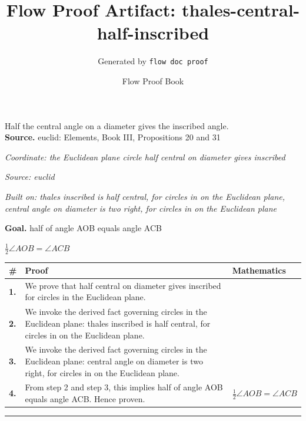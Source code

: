 \documentclass[11pt]{article}
\title{Flow Proof Artifact: thales-central-half-inscribed}
\author{Generated by \texttt{flow doc proof}}
\date{Flow Proof Book}
\theoremstyle{definition}
\begin{document}
\maketitle
Half the central angle on a diameter gives the inscribed angle.\\[0.5em]
\textbf{Source.} euclid: Elements, Book III, Propositions 20 and 31\\[0.5em]
\bigskip
{}\par
\smallskip\noindent\textit{Coordinate: the Euclidean plane \cdot circle \cdot half central on diameter gives inscribed}\par
\smallskip\noindent\textit{Source: euclid}\par
\smallskip\noindent\textit{Built on: thales inscribed is half central, for circles in on the Euclidean plane, central angle on diameter is two right, for circles in on the Euclidean plane}\par
\medskip
\noindent\textbf{Goal.} half of angle AOB equals angle ACB\par
\noindent$\displaystyle \tfrac{1}{2}\angle AOB = \angle ACB$\par
\medskip
\noindent
\begin{tabular}{@{} >{\raggedright\arraybackslash}p{} >{\raggedright\arraybackslash}p{} >{\raggedleft\arraybackslash}p{} @{}}
\textbf{\#} & \textbf{Proof} & \textbf{Mathematics} \\
\midrule
\textbf{1.} & We prove that half central on diameter gives inscribed for circles in the Euclidean plane. & \\[0.45em]
\textbf{2.} & We invoke the derived fact governing circles in the Euclidean plane: thales inscribed is half central, for circles in on the Euclidean plane. & \\[0.45em]
\textbf{3.} & We invoke the derived fact governing circles in the Euclidean plane: central angle on diameter is two right, for circles in on the Euclidean plane. & \\[0.45em]
\textbf{4.} & From step 2 and step 3, this implies half of angle AOB equals angle ACB. Hence proven. & $\displaystyle \tfrac{1}{2}\angle AOB = \angle ACB$ \\[0.45em]
\bottomrule
\end{tabular}
\label{thm:Geometry-circle-half_central_on_diameter_gives_inscribed}
\par\medskip\hrule
\end{document}
